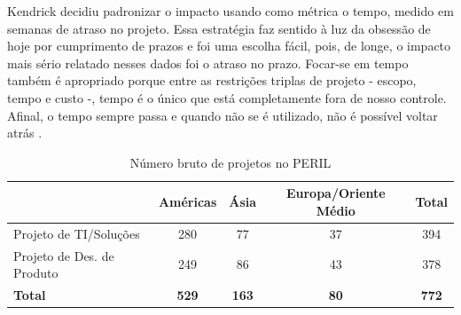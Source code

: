 Kendrick decidiu padronizar o impacto usando como métrica o tempo, medido em semanas de atraso no projeto. Essa estratégia faz sentido à luz da obsessão de hoje por cumprimento de prazos e foi uma escolha fácil, pois, de longe, o impacto mais sério relatado nesses dados foi o atraso no prazo. Focar-se em tempo também é apropriado porque entre as restrições triplas de projeto - escopo, tempo e custo -, tempo é o único que está completamente fora de nosso controle. Afinal, o tempo sempre passa e quando não se é utilizado, não é possível voltar atrás \cite{KEND2003BOOK}.

\begin{table}[h]
\caption{Número bruto de projetos no PERIL}\label{tab:peril_numbers} \centering
\begin{tabular}{|l|c|c|c|c|}
 \hline
 \multicolumn{1}{|c|}{} & Américas & Ásia & Europa/Oriente Médio & Total \\
 \hline
  Projeto de TI/Soluções & 280 & 77 & 37 & 394 \\
  Projeto de Des. de Produto & 249 & 86 & 43 & 378 \\
 \hline
  \textbf{Total} & \textbf{529} & \textbf{163} & \textbf{80} & \textbf{772} \\
 \hline
\end{tabular}
\end{table}

